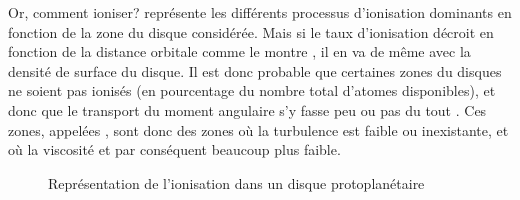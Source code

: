 Or, comment ioniser?  représente les différents processus d'ionisation dominants en fonction de la zone du disque considérée. Mais si le taux d'ionisation décroit en fonction de la distance orbitale \citep{ilgner2006ionisation1} comme le montre , il en va de même avec la densité de surface du disque. Il est donc probable que certaines zones du disques ne soient pas ionisés (en pourcentage du nombre total d'atomes disponibles), et donc que le transport du moment angulaire s'y fasse peu ou pas du tout \citep{gammie1996layered}. Ces zones, appelées , sont donc des zones où la turbulence est faible ou inexistante, et où la viscosité et par conséquent beaucoup plus faible. 

\begin{figure}[htbp]
\centering
{}\hfill
{}
\caption{Représentation de l'ionisation dans un disque protoplanétaire}
\end{figure}

